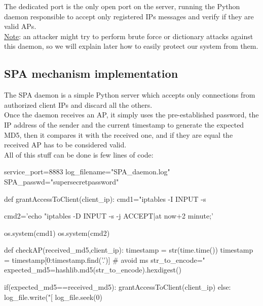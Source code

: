 \documentclass[12pt]{report}
\begin{document}
{{The dedicated port is the only open port on the server, running the Python daemon responsible to accept only registered IPs messages and verify if they are valid APs.\\
\underline{Note}:  an attacker might try to perform brute force or dictionary attacks against this daemon, so we will explain later how to easily protect our system from them.\\

\subsection{SPA mechanism implementation}
\bigskip

The SPA daemon is a simple Python server which accepts only connections from authorized client IPs and discard all the others.\\

Once the daemon receives an AP, it simply uses the pre-established password, the IP address of the sender and the current timestamp to generate the expected MD5, then it compares it with the received one, and if they are equal the received AP has to be considered valid.\\
All of this stuff can be done is few lines of code:\\

\begin{python}

service_port=8883
log_filename="SPA_daemon.log"
SPA_passwd="supersecretpassword"

def grantAccessToClient(client_ip):
  cmd1="iptables -I INPUT -s %
  
  cmd2='echo "iptables -D INPUT -s %
        -j ACCEPT|at now+2 minute;' %
        
  os.system(cmd1)
  os.system(cmd2)                                      
                                         
                                                            
def checkAP(received_md5,client_ip):
  timestamp = str(time.time())
  timestamp = timestamp[0:timestamp.find('.')] # avoid ms
  str_to_encode="%
  expected_md5=hashlib.md5(str_to_encode).hexdigest()

  if(expected_md5==received_md5):
    grantAccessToClient(client_ip)
  else:
    log_file.write("[%
    log_file.seek(0)
  

\end{python}}}
\end{document}
